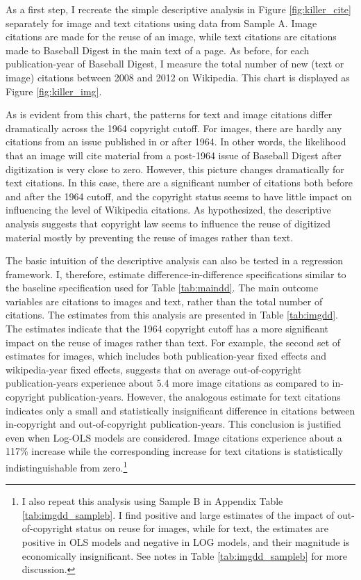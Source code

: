 \documentclass[11pt]{article}
\begin{document}
As a first step, I recreate the simple descriptive analysis in Figure \ref{fig:killer_cite} separately for image and text citations using data from Sample A. Image citations are made for the reuse of an image, while text citations are citations made to Baseball Digest in the main text of a page. As before, for each publication-year of Baseball Digest, I measure the total number of new (text or image) citations between 2008 and 2012 on Wikipedia. This chart is displayed as Figure \ref{fig:killer_img}.  

As is evident from this chart, the patterns for text and image citations differ dramatically across the 1964 copyright cutoff. For images, there are hardly any citations from an issue published in or after 1964. In other words, the likelihood that an image will cite material from a post-1964 issue of Baseball Digest after digitization is very close to zero. However, this picture changes dramatically for text citations. In this case, there are a significant number of citations both before and after the 1964 cutoff, and the copyright status seems to have little impact on influencing the level of Wikipedia citations. As hypothesized, the descriptive analysis suggests that copyright law seems to influence the reuse of digitized material mostly by preventing the reuse of images rather than text. 

The basic intuition of the descriptive analysis can also be tested in a regression framework. I, therefore, estimate difference-in-difference specifications similar to the baseline specification used for Table \ref{tab:maindd}. The main outcome variables are citations to images and text, rather than the total number of citations. The estimates from this analysis are presented in Table \ref{tab:imgdd}. The estimates indicate that the 1964 copyright cutoff has a more significant impact on the reuse of images rather than text. For example, the second set of estimates for images, which includes both publication-year fixed effects and wikipedia-year fixed effects, suggests that on average out-of-copyright publication-years experience about 5.4 more image citations as compared to in-copyright publication-years. However, the analogous estimate for text citations indicates only a small and statistically insignificant difference in citations between in-copyright and out-of-copyright publication-years. This conclusion is justified even when Log-OLS models are considered. Image citations experience about a 117\% increase while the corresponding increase for text citations is statistically indistinguishable from zero.\footnote{I also repeat this analysis using Sample B in Appendix Table \ref{tab:imgdd_sampleb}. I find positive and large estimates of the impact of out-of-copyright status on reuse for images, while for text, the estimates are positive in OLS models and negative in LOG models, and their magnitude is economically insignificant. See notes in Table \ref{tab:imgdd_sampleb} for more discussion.}
\end{document}
